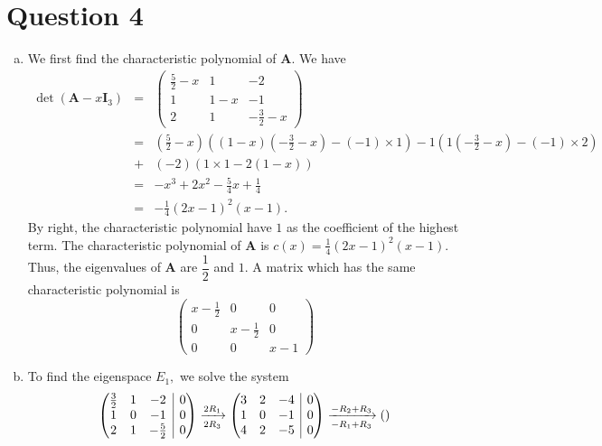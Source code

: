 \documentclass{article}
\makeatletter
\newcommand{\matr}[1]{\mathbf{#1}}
\newenvironment{rowequmat}[1]{\left(\array{@{}#1@{}}}{\endarray\right)}
\makeatother
\begin{document}
\section*{Question 4}
\begin{enumerate}[(a)]
    \item We first find the characteristic polynomial of $\matr{A}.$ We have
    \begin{eqnarray*}
    \det(\matr{A}-x\matr{I}_3)&=&\begin{pmatrix}\frac{5}{2}-x&1&-2\\1&1-x&-1\\2&1&-\frac{3}{2}-x\end{pmatrix}\\
    &=&\left(\frac{5}{2}-x\right)\left((1-x)\left(-\frac{3}{2}-x\right)-(-1)\times1\right)-1\left(1\left(-\frac{3}{2}-x\right)-(-1)\times2\right)\\
    &+&(-2)(1\times1-2(1-x))\\
    &=&-x^3+2x^2-\frac{5}{4}x+\frac{1}{4}\\
    &=&-\frac{1}{4}(2x-1)^2(x-1).
    \end{eqnarray*}
    By right, the characteristic polynomial have $1$ as the coefficient of the highest term. The characteristic polynomial of $\matr A$ is $c(x) = \frac{1}{4}(2x-1)^2(x-1)$.
    Thus, the eigenvalues of $\matr{A}$ are $\dfrac{1}{2}$ and $1.$
    A matrix which has the same characteristic polynomial is
    \begin{equation}
    \left(\begin{array}{rrr}
    x-\frac{1}{2} & 0 & 0 \\
    0 & x-\frac{1}{2} & 0 \\
    0 & 0 & x-1
    \end{array}\right)
    \end{equation}
    \item To find the eigenspace $E_1,$ we solve the system
    \begin{eqnarray*}
    \begin{rowequmat}{ccc|c}
     \frac{3}{2} &  1 & -2 & 0 \\
     1 &  0 & -1 & 0 \\
     2 & 1 & -\frac{5}{2} & 0
    \end{rowequmat}\xrightarrow[2R_3]{2R_1}\begin{rowequmat}{ccc|c}
     3 & 2 & -4 & 0 \\
     1 & 0 & -1 & 0 \\
     4 & 2 & -5 & 0
    \end{rowequmat}\xrightarrow[-R_1+R_3]{-R_2+R_3}\begin{rowequmat}{ccc|c}

\end{rowequmat}
\end{eqnarray*}
\end{enumerate}
\end{document}
